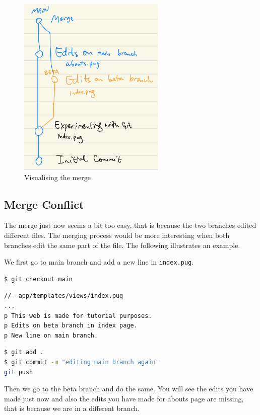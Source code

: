 \begin{figure}[h]
\centering
\includegraphics[width=7cm]{images/ch8-merge-safe.png}
\caption{Visualising the merge}
\end{figure}

\subsection{Merge Conflict}
\label{sec:mergeconflict}
The merge just now seems a bit too easy, that is because the two branches edited different files. The merging process would be more interesting when both branches edit the same part of the file. The following illustrates an example.
\vspace{6mm}

We first go to main branch and add a new line in \texttt{index.pug}.
\vspace{6mm}

\begin{lstlisting}[language=bash]
$ git checkout main
\end{lstlisting}

\begin{lstlisting}[language=pug]
//- app/templates/views/index.pug
...
p This web is made for tutorial purposes.
p Edits on beta branch in index page.
p New line on main branch.
\end{lstlisting}

\begin{lstlisting}[language=bash]
$ git add .
$ git commit -m "editing main branch again"
git push
\end{lstlisting}
\vspace{6mm}

Then we go to the beta branch and do the same. You will see the edits you have made just now and also the edits you have made for abouts page are missing, that is because we are in a different branch.
\vspace{6mm}

